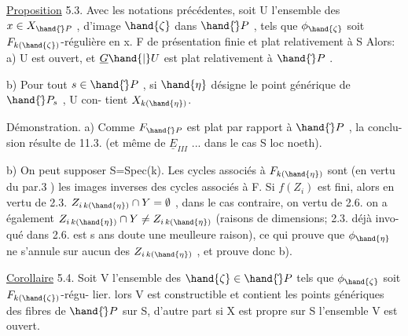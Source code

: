 
\uline{Proposition} 5.3.   Avec les notations précédentes, soit U l'ensemble des
$x\in X_{\hand{\check{}}P}$ , d'image $\hand{\zeta}$ dans $\hand{\check{}}P$ , tels que $\phi_{\hand{\zeta}}$ soit $F_{k(\hand{\zeta})}$-régulière en x.   F de présentation finie et plat relativement à S\hand{,} Alors:
a) U est ouvert, et $\underline{G}\hand{|}U$ est plat relativement à $\hand{\check{}}P$ .

b) Pour tout $s\in\hand{\check{}}P$ , si $\hand{\eta}$ désigne le point générique de $\hand{\check{}}P_s$ , U con-%
tient $X_{k(\hand{\eta})}$.

Démonstration. a) Comme $F_{\hand{\check{}}P}$ est  plat par rapport à $\hand{\check{}}P$ , la conclu-%
sion résulte de 11.3. (et même de $\underline{E}_{III}$ ... dans le cas S loc noeth).

b) On peut supposer S=Spec(k). Les cycles associés à $F_{k(\hand{\eta})}$ sont
(en vertu du par.3 ) les images inverses des cycles  associés à F.  Si $f(Z_i)$ est fini, alors en vertu de 2.3. 
$Z_{i\,k(\hand{\eta})}\cap Y = \emptyset$ , dans le cas contraire, on vertu de 2.6. on a
également $Z_{i\,k(\hand{\eta})}\cap Y \neq Z_{i\,k(\hand{\eta})}$ (raisons de dimensions; 2.3. déjà invo-%
qué dans 2.6. est s ans doute une meulleure raison), ce qui prouve que $\phi_{\hand{\eta}}$
ne s'annule sur aucun des $Z_{i\,k(\hand{\eta})}$ , et prouve donc b).

\uline{Corollaire} 5.4. Soit V l'ensemble des $\hand{\zeta}\in\hand{\check{}}P$ tels que $\phi_{\hand{\zeta}}$ soit  $F_{k(\hand{\zeta})}$-régu-%
lier.  lors V est constructible et contient les points génériques des
fibres de $\hand{\check{}}P$ sur S, d'autre part si  X est propre sur S\hand{,} l'ensemble V est
ouvert. 

